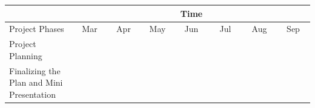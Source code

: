 \documentclass[titlepage]{report}
\begin{document}
\begin{table}[ht]
\begin{adjustbox}{width=1.3\textwidth}
\begin{tabular}{|l|l|l|l|l|l|l|l|l|l|l|l|l|l|l|l|l|l|l|l|l|l|l|l|l|l|l|l|l|}
\hline
                                             & \multicolumn{28}{c|}{Time}                                                                                                                                                                                                                                                                                                                                                                                                                                                                                                                                                                                                                                                        \\ \hline
Project Phases                               & \multicolumn{4}{c|}{Mar}                                  & \multicolumn{4}{c|}{Apr}                                                                                  & \multicolumn{4}{c|}{May}                                                                                  & \multicolumn{4}{c|}{Jun}                                                                                  & \multicolumn{4}{c|}{Jul}                                                                                  & \multicolumn{4}{c|}{Aug}                                                                                  & \multicolumn{4}{c|}{Sep}                                  \\ \hline
Project Planning                             &  &  & \cellcolor[HTML]{32CB00} & \cellcolor[HTML]{32CB00} &                          &                          &                          &                          &                          &                          &                          &                          &                          &                          &                          &                          &                          &                          &                          &                          &                          &                          &                          &                          &                          &                          &  &  \\ \hline
Finalizing the Plan and Mini Presentation    &  &  &                          &                          & \cellcolor[HTML]{32CB00} & \cellcolor[HTML]{32CB00} &                          &                          &                          &                          &                          &                          &                          &                          &                          &                          &                          &                          &                          &                          &                          &                          &                          &                          &                          &                          &  &  \\ \hline

\end{tabular}
\end{adjustbox}
\end{table}
\end{document}

